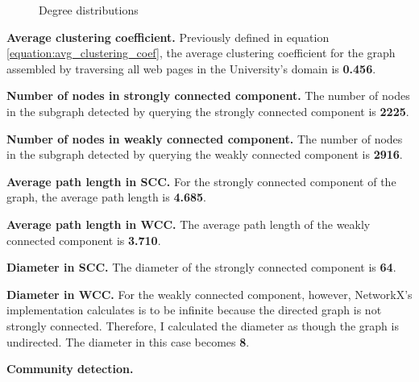 \begin{figure}
    \centering
    \qquad
    \caption{Degree distributions}
    \label{fig:6}
\end{figure}

\textbf{Average clustering coefficient.} Previously defined in equation \ref{equation:avg_clustering_coef}, the average clustering coefficient for the graph assembled by traversing all web pages in the University's domain is \textbf{0.456}.

\textbf{Number of nodes in strongly connected component.} The number of nodes in the subgraph detected by querying the strongly connected component is \textbf{2225}.

\textbf{Number of nodes in weakly connected component.} The number of nodes in the subgraph detected by querying the weakly connected component is \textbf{2916}.

\textbf{Average path length in SCC.} For the strongly connected component of the graph, the average path length is \textbf{4.685}.

\textbf{Average path length in WCC.} The average path length of the weakly connected component is \textbf{3.710}.

\textbf{Diameter in SCC.} The diameter of the strongly connected component is \textbf{64}.

\textbf{Diameter in WCC.} For the weakly connected component, however, NetworkX's implementation calculates is to be infinite because the directed graph is not strongly connected. Therefore, I calculated the diameter as though the graph is undirected. The diameter in this case becomes \textbf{8}.

\textbf{Community detection.}